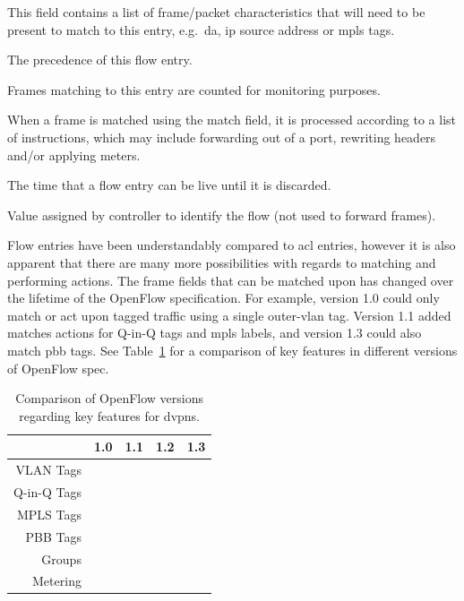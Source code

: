 \begin{description}[leftmargin=!,labelwidth=\widthof{\bfseries Instructions}]
	\item[Match] This field contains a list of frame/packet characteristics that will need to be present to match to this entry, e.g.\ \ac{da}, \ac{ip} source address or \ac{mpls} tags.
	\item[Priority] The precedence of this flow entry.
	\item[Counters] Frames matching to this entry are counted for monitoring purposes.
	\item[Instructions] When a frame is matched using the match field, it is processed according to a list of instructions, which may include forwarding out of a port, rewriting headers and/or applying meters.
	\item[Timeouts] The time that a flow entry can be live until it is discarded.
	\item[Cookie] Value assigned by controller to identify the flow (not used to forward frames).
\end{description}

Flow entries have been understandably compared to \acs{acl} entries, however it is also apparent that there are many more possibilities with regards to matching and performing actions. The frame fields that can be matched upon has changed over the lifetime of the OpenFlow specification. For example, version 1.0 could only match or act upon tagged traffic using a single outer-\acs{vlan} tag. Version 1.1 added matches actions for Q-in-Q tags and \ac{mpls} labels, and version 1.3 could also match \ac{pbb} tags. See Table~\ref{tb:of-versions} for a comparison of key features in different versions of OpenFlow spec. 

\begin{table}[h]
	\centering
	\begin{tabular}{r|cccc}
	 			& 1.0 & 1.1 & 1.2 & 1.3\\
	\hline
	VLAN Tags 	& \checkmark & \checkmark & \checkmark & \checkmark \\
	Q-in-Q Tags &   & \checkmark & \checkmark & \checkmark \\
	MPLS Tags 	&   & \checkmark & \checkmark & \checkmark \\
	PBB Tags 	&   &   &   & \checkmark \\
	Groups 		&   & \checkmark & \checkmark & \checkmark \\
	Metering 	&   &   &   & \checkmark \\
	\end{tabular}
	\caption{Comparison of OpenFlow versions regarding key features for \acp{dvpn}.}
	\label{tb:of-versions}	
\end{table}

